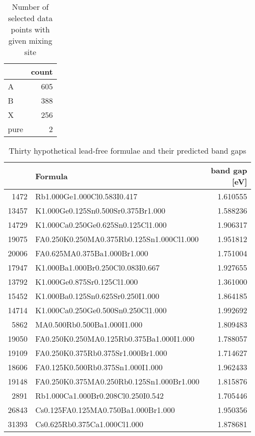  
\begin{table}[htbp]
\caption{\label{tbl:mixscreen} Number of selected data points with given mixing site}
\centering
\begin{tabular}{lr}
 & count\\[0pt]
\hline
A & 605\\[0pt]
B & 388\\[0pt]
X & 256\\[0pt]
pure & 2\\[0pt]
\end{tabular}
\end{table}

 
\begin{table}[htbp]
\caption{\label{tbl:pbfree} Thirty hypothetical lead-free formulae and their predicted band gaps}
\centering
\begin{tabular}{rlr}
 & Formula & band gap [eV]\\[0pt]
\hline
1472 & Rb1.000Ge1.000Cl0.583I0.417 & 1.610555\\[0pt]
13457 & K1.000Ge0.125Sn0.500Sr0.375Br1.000 & 1.588236\\[0pt]
14729 & K1.000Ca0.250Ge0.625Sn0.125Cl1.000 & 1.906317\\[0pt]
19075 & FA0.250K0.250MA0.375Rb0.125Sn1.000Cl1.000 & 1.951812\\[0pt]
20006 & FA0.625MA0.375Ba1.000Br1.000 & 1.751004\\[0pt]
17947 & K1.000Ba1.000Br0.250Cl0.083I0.667 & 1.927655\\[0pt]
13792 & K1.000Ge0.875Sr0.125Cl1.000 & 1.361000\\[0pt]
15452 & K1.000Ba0.125Sn0.625Sr0.250I1.000 & 1.864185\\[0pt]
14714 & K1.000Ca0.250Ge0.500Sn0.250Cl1.000 & 1.992692\\[0pt]
5862 & MA0.500Rb0.500Ba1.000I1.000 & 1.809483\\[0pt]
19050 & FA0.250K0.250MA0.125Rb0.375Ba1.000I1.000 & 1.788057\\[0pt]
19109 & FA0.250K0.375Rb0.375Sr1.000Br1.000 & 1.714627\\[0pt]
18606 & FA0.125K0.500Rb0.375Sn1.000I1.000 & 1.962433\\[0pt]
19148 & FA0.250K0.375MA0.250Rb0.125Sn1.000Br1.000 & 1.815876\\[0pt]
2891 & Rb1.000Ca1.000Br0.208Cl0.250I0.542 & 1.705446\\[0pt]
26843 & Cs0.125FA0.125MA0.750Ba1.000Br1.000 & 1.950356\\[0pt]
31393 & Cs0.625Rb0.375Ca1.000Cl1.000 & 1.878681\\[0pt]

\end{tabular}
\end{table}
